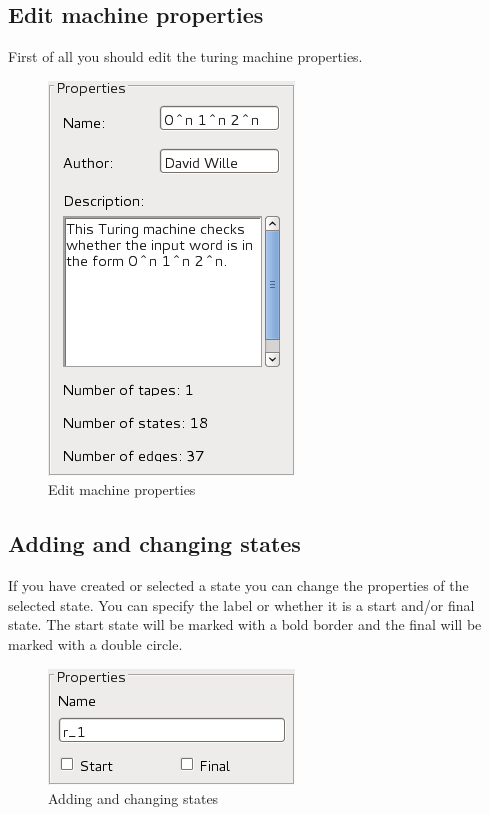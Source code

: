 \documentclass[%
  a4paper,%
  11pt,%
  blue,%
  hyperref	%
  ]{tubsartcl}
\begin{document}
\clearpage

\subsection{Edit machine properties}
\label{sec:edit-mach-prop}
First of all you should edit the turing machine properties.
\begin{figure}[!htb]
\begin{center}
\includegraphics[scale=0.5]{graphics_gui/machine_properties.png}
\end{center}
\caption{Edit machine properties}
\label{pic:machine_properties}
\end{figure}

\subsection{Adding and changing states}
\label{sec:add-edit-states}
If you have created or selected a state you can change the properties of the selected state. You can specify the label or whether it is a start and/or final state. The start state will be marked with a bold border and the final will be marked with a double circle.
\begin{figure}[!htb]
\begin{center}
\includegraphics[scale=0.5]{graphics_gui/state_properties.png}
\end{center}
\caption{Adding and changing states}
\label{pic:state_properties}
\end{figure}
\end{document}
